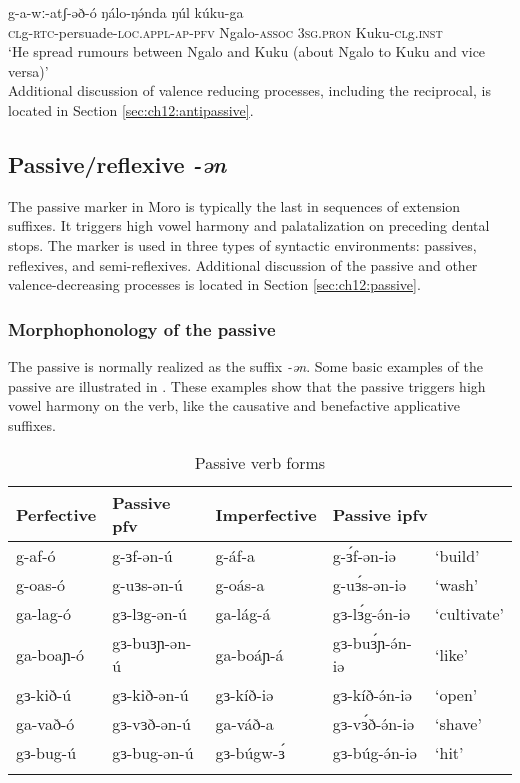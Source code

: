 \ea
\gll	g-a-wː-atʃ-əð-ó 	ŋálo-ŋə́nda 	ŋúl		kúku-ga\\
	\textsc{cl}g-\textsc{rtc}-persuade-\textsc{loc.appl-ap-\textsc{pfv}}	Ngalo-\textsc{assoc}	\textsc{3sg.pron}	Kuku-\textsc{cl}g.\textsc{inst}\\

	`He spread rumours between Ngalo and Kuku (about Ngalo to Kuku and vice versa)’\\
\z
Additional discussion of valence reducing processes, including the reciprocal, is located in Section \ref{sec:ch12:antipassive}.


\subsection{Passive/reflexive \textit{-ən}}\label{sec:ch11:passive}

The passive marker in Moro is typically the last in sequences of extension suffixes. It triggers high vowel harmony and palatalization on preceding dental stops. The marker is used in three types of syntactic environments: passives, reflexives, and semi-reflexives. Additional discussion of the passive and other valence-decreasing processes is located in Section \ref{sec:ch12:passive}.

\subsubsection{Morphophonology of the passive}

The passive is normally realized as the suffix \textit{-ən}. Some basic examples of the passive are illustrated in . These examples show that the passive triggers high vowel harmony on the verb, like the causative and benefactive applicative suffixes.

%

\begin{table}
\begin{tabular}[t]{lllll} 
\lsptoprule
Perfective	& 	Passive pfv 	& Imperfective & \multicolumn{2}{l}{Passive ipfv} 	 \\
\midrule
g-af-ó			&	g-ɜf-ən-ú		&	g-áf-a		&	g-ɜ́f-ən-iə		& `build'\\%
g-oas-ó			& 	g-uɜs-ən-ú		& 	g-oás-a		& 	g-uɜ́s-ən-iə 		& ‘wash’	\\
ga-lag-ó		&	gɜ-lɜg-ən-ú		& 	ga-lág-á	&	gɜ-lɜ́g-ə́n-iə 		& ‘cultivate’\\
ga-boaɲ-ó		& 	gɜ-buɜɲ-ən-ú	&   ga-boáɲ-á	&   gɜ-buɜ́ɲ-ə́n-iə 	& `like' \\
gɜ-kið-ú		&	gɜ-kið-ən-ú		&	gɜ-kíð-iə	&	gɜ-kíð-ə́n-iə		&	‘open’\\
ga-vað-ó		&	gɜ-vɜð-ən-ú		&	ga-váð-a	&	gɜ-vɜ́ð-ə́n-iə		&	‘shave’\\
gɜ-bug-ú		&	gɜ-bug-ən-ú		&	gɜ-búgw-ɜ́	&	gɜ-búg-ə́n-iə		&	‘hit’\\ %
\lspbottomrule
\end{tabular}
\caption{Passive verb forms} \label{tab:ch11:passive}    
\end{table}  

